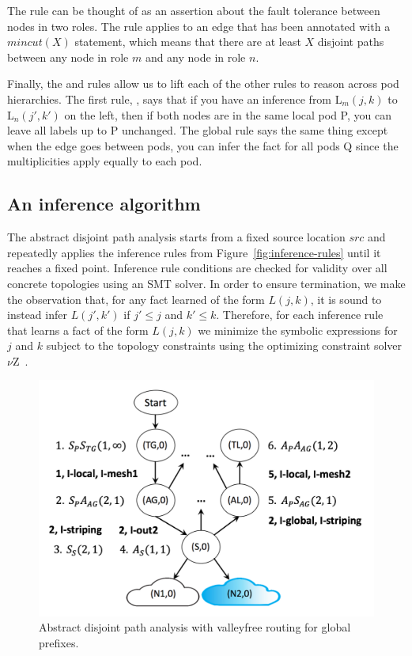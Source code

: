 \documentclass[numbers, 10pt, preprint]{sigplanconf}
\begin{document}
The rule  can be thought of as an assertion about the fault tolerance between nodes in two roles. The rule applies to an edge that has been annotated with a $mincut(X)$ statement, which means that there are at least $X$ disjoint paths between any node in role $m$ and any node in role $n$. 

Finally, the  and  rules allow us to lift each of the other rules to reason across pod hierarchies. The first rule, , says that if you have an inference from L$_m(j,k)$ to L$_n(j',k')$ on the left, then if both nodes are in the same local pod P, you can leave all labels up to P unchanged. The global rule  says the same thing except when the edge goes between pods, you can infer the fact for all pods Q since the multiplicities apply equally to each pod.

\subsection{An inference algorithm}

The abstract disjoint path analysis starts from a fixed source location $src$ and repeatedly applies the inference rules from Figure~\ref{fig:inference-rules} until it reaches a fixed point. Inference rule conditions are checked for validity over all concrete topologies using an SMT solver. In order to ensure termination, we make the observation that, for any fact learned of the form $L(j,k)$, it is sound to instead infer $L(j',k')$ if $j' \leq j$ and $k' \leq k$. Therefore, for each inference rule that learns a fact of the form $L(j,k)$ we minimize the symbolic expressions for $j$ and $k$ subject to the topology constraints using the optimizing constraint solver $\nu$Z~\cite{z3opt}.

\begin{figure}
  \begin{center}
    \includegraphics[width=\columnwidth]{figures/analysis}
  \end{center}
  \caption{Abstract disjoint path analysis with valleyfree routing for global prefixes. \label{fig:compilation-times}}
  \label{fig:example-inference}
  \vspace{-1em}
\end{figure}
\end{document}
